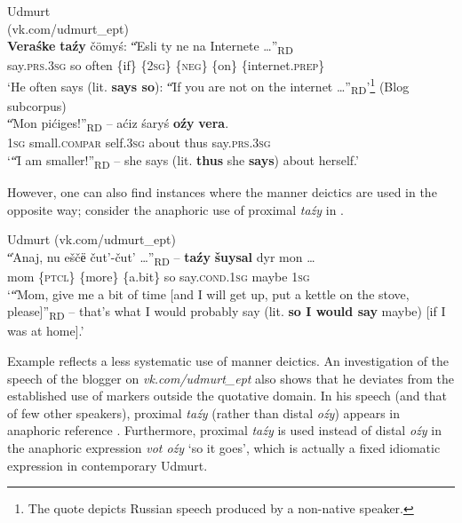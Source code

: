 \documentclass[output=paper,colorlinks,citecolor=brown]{langscibook}
\begin{document}
\ea\label{ex:teptiuk:12} {Udmurt}\\
\ea\label{ex:teptiuk:12a} {(vk.com/udmurt\_ept)}\\
\gll \textbf{Veraśke} \textbf{taźy} čömyś: \|“Esli ty ne na Internete {…}”\|\textsubscript{RD}\\
 say.\textsc{prs}.3\textsc{sg} so often {\db}{\db}\{if\} \{2\textsc{sg}\} \{\textsc{neg}\} \{on\} \{internet.\textsc{prep}\}\\
\glt ‘He often says (lit. \textbf{says so}): \|“If you are not on the internet …”\|\textsubscript{RD}’\footnote{The quote depicts Russian speech produced by a non-native speaker.}
\ex\label{ex:teptiuk:12b} {(Blog subcorpus)}\\
\gll \|“Mon pićiges!”\|\textsubscript{RD} – aćiz śaryś \textbf{oźy} \textbf{vera}.\\
{\db}{\db}\textsc{1sg} small.\textsc{compar} {} self.3\textsc{sg} about thus say.\textsc{prs}.3\textsc{sg}\\
\glt ‘\|“I am smaller!”\|\textsubscript{RD} – she says (lit. \textbf{thus} she \textbf{says}) about herself.’
\z
\z

However, one can also find instances where the manner deictics are used in the opposite way; consider the anaphoric use of proximal \textit{taźy} in .

\ea\label{ex:teptiuk:13} {Udmurt (vk.com/udmurt\_ept)}\\
\gll \|“Anaj, nu eščё {čut’-čut’} …”\|\textsubscript{RD} – \textbf{taźy} \textbf{šuysal} dyr mon …\\
{\db}{\db}mom \{\textsc{ptcl}\} \{more\} \{a.bit\} {} {} so say.\textsc{cond.1sg} maybe \textsc{1sg}\\
\glt ‘\|“Mom, give me a bit of time [and I will get up, put a kettle on the stove, please]”\|\textsubscript{RD} – that’s what I would probably say (lit. \textbf{so I would say} maybe) [if I was at home].’
\z

Example  reflects a less systematic use of manner deictics. An investigation of the speech of the blogger on \textit{vk.com/udmurt\_ept} also shows that he deviates from the established use of markers outside the quotative domain. In his speech (and that of few other speakers), proximal \textit{taźy} (rather than distal \textit{oźy}) appears in anaphoric reference . Furthermore, proximal \textit{taźy} is used instead of distal \textit{oźy} in the anaphoric expression \textit{vot oźy} ‘so it goes’, which is actually a fixed idiomatic expression in contemporary Udmurt.
\end{document}
